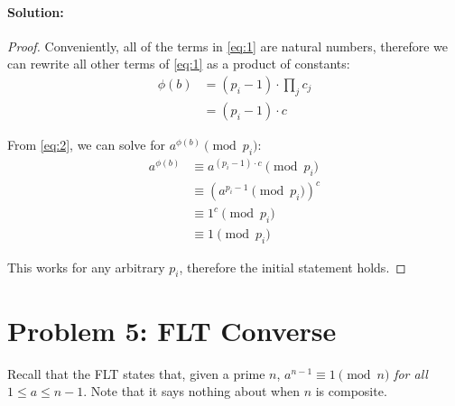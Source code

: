 \documentclass[11pt, notitlepage]{report}
\newcommand{\Question}[1]{\newpage\section{#1}}
\newenvironment{solution}{\paragraph{Solution:}}{\hfill}
\begin{document}
\begin{enumerate}[label=(\alph*)]
\begin{solution}
\begin{proof}
    	Conveniently, all of the terms in \eqref{eq:1} are natural numbers, therefore we can rewrite all other terms of \eqref{eq:1} as a product of constants:
    	\begin{align}
    		\phi{(b)} &= (p_i - 1)\cdot \prod_{j}{c_j} \\
    				  &= (p_i - 1)\cdot c \label{eq:2}
    	\end{align}

		From \eqref{eq:2}, we can solve for $a^{\phi{(b)}} \pmod{p_i}$:
		\begin{align}
			a^{\phi(b)} &\equiv a^{(p_i -1)\cdot c} \pmod{p_i} \\
			&\equiv  (a^{p_i -1} \pmod{p_i})^{c} \\
			&\equiv 1^c \pmod{p_i} \\
			&\equiv 1 \pmod{p_i}
		\end{align}
		
		This works for any arbitrary $p_i$, therefore the initial statement holds.
	    \end{proof}

    \end{solution}

  \end{enumerate}


\Question{Problem 5: FLT Converse}

Recall that the FLT states that, given a prime $n$, $a^{n-1} \equiv 1 \pmod{n}$ \textit{for all $1 \leq a \leq n-1$}. Note that it says nothing about when $n$ is composite.
\end{document}
